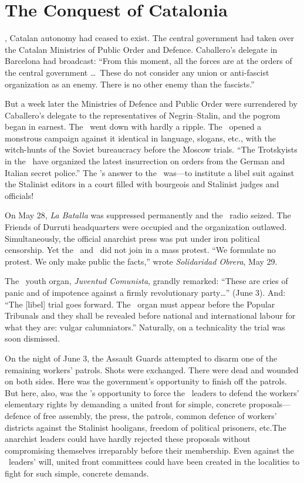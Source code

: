\chapter{The Conquest of Catalonia}

, Catalan autonomy had ceased to exist. The central government had taken over the Catalan Ministries of Public Order and Defence. Caballero’s delegate in Barcelona had broadcast: ``From this moment, all the forces are at the orders of the central government \dots\ These do not consider any union or anti-fascist organization as an enemy. There is no other enemy than the fascists.''

But a week later the Ministries of Defence and Public Order were surrendered by Caballero’s delegate to the representatives of Negrin--Stalin, and the pogrom began in earnest. The \POUM\ went down with hardly a ripple. The \PSUC\ opened a monstrous campaign against it identical in language, slogans, etc., with the witch-hunts of the Soviet bureaucracy before the Moscow trials. ``The Trotskyists in the \POUM\ have organized the latest insurrection on orders from the German and Italian secret police.'' The \POUM’s answer to the \PSUC\ was---to institute a libel suit against the Stalinist editors in a court filled with bourgeois and Stalinist judges and officials!

On May 28, \emph{La Batalla} was suppressed permanently and the \POUM\ radio seized. The Friends of Durruti headquarters were occupied and the organization outlawed. Simultaneously, the official anarchist press was put under iron political censorship. Yet the \POUM\ and \CNT\ did not join in a mass protest. ``We formulate no protest. We only make public the facts,'' wrote \emph{Solidaridad Obrera}, May 29.

The \POUM\ youth organ, \emph{Juventud Comunista}, grandly remarked: ``These are cries of panic and of impotence against a firmly revolutionary party\dots'' (June 3). And: ``The [libel] trial goes forward. The \PSUC\ organ must appear before the Popular Tribunals and they shall be revealed before national and international labour for what they are: vulgar calumniators.'' Naturally, on a technicality the trial was soon dismissed.

On the night of June 3, the Assault Guards attempted to disarm one of the remaining workers’ patrols. Shots were exchanged. There were dead and wounded on both sides. Here was the government’s opportunity to finish off the patrols. But here, also, was the \POUM’s opportunity to force the \CNT\ leaders to defend the workers’ elementary rights by demanding a united front for simple, concrete proposals---defence of free assembly, the press, the patrols, common defence of workers’ districts against the Stalinist hooligans, freedom of political prisoners, etc.\@ The anarchist leaders could have hardly rejected these proposals without compromising themselves irreparably before their membership. Even against the \CNT\ leaders’ will, united front committees could have been created in the localities to fight for such simple, concrete demands.


